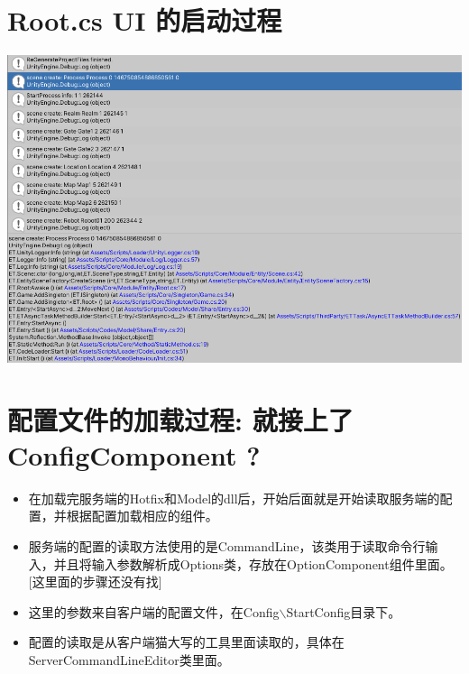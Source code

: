 \documentclass[9pt, b5paper]{article}
\begin{document}
\section{Root.cs UI 的启动过程}
\label{sec-11}

\includegraphics[width=.9\linewidth]{./pic/readme_20230125_092445.png}
\section{配置文件的加载过程:  就接上了ConfigComponent ?}
\label{sec-12}
\begin{itemize}
\item 在加载完服务端的Hotfix和Model的dll后，开始后面就是开始读取服务端的配置，并根据配置加载相应的组件。
\item 服务端的配置的读取方法使用的是CommandLine，该类用于读取命令行输入，并且将输入参数解析成Options类，存放在OptionComponent组件里面。[这里面的步骤还没有找]
\item 这里的参数来自客户端的配置文件，在Config$\backslash$StartConfig目录下。
\item 配置的读取是从客户端猫大写的工具里面读取的，具体在ServerCommandLineEditor类里面。
\end{itemize}
\end{document}
